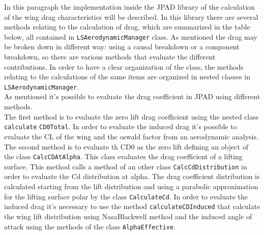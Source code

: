In this paragraph the implementation inside the JPAD library of the calculation of the wing drag characteristics will be described. In this library there are several methods relating to the calculation of drag, which are summarized in the table below, all contained in \texttt{LSAerodynamicManager} class. As mentioned the drag may be broken down in different way: using a causal breakdown or a component breakdown, so there are various methods that evaluate the different contributions. In order to have a clear organization of the class, the methods relating to the calculations of the same items are organized in nested classes in  \texttt{LSAerodynamicManager}.\\ 
As mentioned it's possible to evaluate the drag coefficient in JPAD using different methods. \\
The first method is to evaluate the zero lift drag coefficient using the nested class \texttt{calculate} \texttt{CD0Total}. In order to evaluate the induced drag it's possible to evaluate the CL of the wing and the oswald factor from an aerodynamic analysis.\\
The second method is to evaluate th CD0 as the zero lift defining an object of the class  \texttt{CalcCDAtAlpha}. This class evaluates the drag coefficient of a lifting surface. This method calls a method of an other class \texttt{CalcCdDistribution} in order to evaluate the Cd distribution at alpha. The drag coefficient distribution is calculated starting from the lift distribution and using a parabolic approximation for the lifting surface polar by the class \texttt{CalculateCd}.  In order to evaluate the induced drag it's necessary to use the method \texttt{calculateCDInduced} that calculate the wing lift distribution using NasaBlackwell method and the induced angle of attack using the methods of the class \texttt{AlphaEffective}.\\
